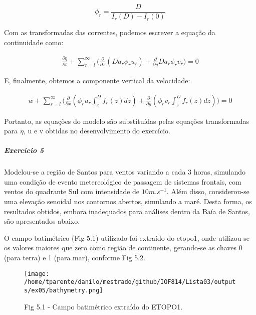 \documentclass[11pt]{article}
\makeatletter
\def\maxwidth{\ifdim\Gin@nat@width>\linewidth\linewidth
    \else\Gin@nat@width\fi}
\let\Oldincludegraphics\includegraphics
\renewcommand{\includegraphics}[1]{\Oldincludegraphics[width=.8\maxwidth]{#1}}
\makeatother
\begin{document}
\begin{equation}
    \phi_r = \frac{D}{I_r(D) - I_r(0)}
    \label{eq:4.15}
\end{equation}

Com as transformadas das correntes, podemos escrever a equação da
continuidade como:

\begin{equation}
\begin{aligned}
    \frac{\partial{\eta}}{\partial{t}} + \sum^{\infty}_{r=l}\bigg( \frac{\partial}{\partial{x}}(D a_r \phi_r u_r) + \frac{\partial}{\partial{y}}D a_r \phi_r v_r \bigg) = 0
    \end{aligned}
\end{equation}

E, finalmente, obtemos a componente vertical da velocidade:

\begin{equation}
\begin{aligned}
    w + \sum^{\infty}_{r=l}\bigg( \frac{\partial}{\partial{x}}(\phi_r u_r\int^{D}_{z}f_r(z)dz) + \frac{\partial}{\partial{y}}(\phi_r v_r\int^{D}_{z}f_r(z)dz) \bigg) = 0
    \end{aligned}
\end{equation}

Portanto, as equações do modelo são substituídas pelas equações
transformadas para \(\eta\), u e v obtidas no desenvolvimento do
exercício.

    \subparagraph{Exercício 5}\label{exercuxedcio-5}

Modelou-se a região de Santos para ventos variando a cada 3 horas,
simulando uma condição de evento metereológico de passagem de sistemas
frontais, com ventos do quadrante Sul com intensidade de
\(10 m.s^{-1}\). Além disso, considerou-se uma elevação senoidal nos
contornos abertos, simulando a maré. Desta forma, os resultados obtidos,
embora inadequados para análises dentro da Baía de Santos, são
apresentados abaixo.

O campo batimétrico (Fig 5.1) utilizado foi extraído do etopo1, onde
utilizou-se os valores maiores que zero como região de continente,
gerando-se as chaves 0 (para terra) e 1 (para mar), conforme Fig 5.2.


\begin{figure}[!ht]
\centering
\centerline{\hbox{\texttt{[image: /home/tparente/danilo/mestrado/github/IOF814/Lista03/outputs/ex05/bathymetry.png]}}}
\caption{Fig 5.1 - Campo batimétrico extraído do ETOPO1.}
\label{fig5:1}
\end{figure}
\end{document}
